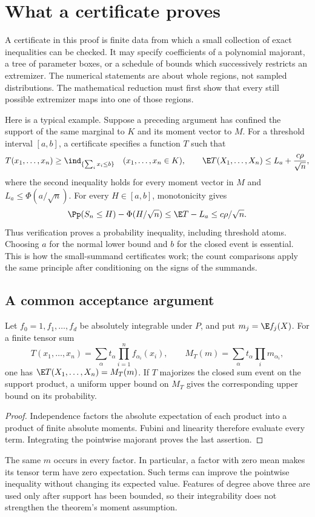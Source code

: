 \section{What a certificate proves}
\label{j:cert:section}

A certificate in this proof is finite data from which a small collection
of exact inequalities can be checked. It may specify coefficients of a
polynomial majorant, a tree of parameter boxes, or a schedule of bounds
which successively restricts an extremizer. The numerical statements are
about whole regions, not sampled distributions. The mathematical
reduction must first show that every still possible extremizer maps into
one of those regions.

Here is a typical example. Suppose a preceding argument has confined the
support of the same marginal to $K$ and its moment vector to $M$.
For a threshold interval $[a,b]$, a certificate specifies a function $T$
such that
\[
 T(x_1,\ldots,x_n)\ge\ind_{\{\sum_i x_i\le b\}}
 \quad(x_1,\ldots,x_n\in K),\qquad
 \E T(X_1,\ldots,X_n)\le L_a+\frac{c\rho}{\sqrt n},
\]
where the second inequality holds for every moment vector in $M$ and
$L_a\le\Phi(a/\sqrt n)$. For every $H\in[a,b]$, monotonicity gives
\[
 \Pp(S_n\le H)-\Phi(H/\sqrt n)
 \le\E T-L_a\le c\rho/\sqrt n.
\]
Thus verification proves a probability inequality, including threshold
atoms. Choosing $a$ for the normal lower bound and $b$ for the closed
event is essential. This is how the small-summand certificates work;
the count comparisons apply the same principle after conditioning on
the signs of the summands.

\subsection{A common acceptance argument}

\begin{lemma}\label{j:cert:tensor}
Let $f_0=1,f_1,\ldots,f_d$ be absolutely integrable under $P$, and put
$m_j=\E f_j(X)$. For a finite tensor sum
\[
 T(x_1,\ldots,x_n)=\sum_\alpha t_\alpha
                         \prod_{i=1}^n f_{\alpha_i}(x_i),
 \qquad M_T(m)=\sum_\alpha t_\alpha\prod_i m_{\alpha_i},
\]
one has $\E T(X_1,\ldots,X_n)=M_T(m)$. If $T$ majorizes the
closed sum event on the support product, a uniform upper bound on
$M_T$ gives the corresponding upper bound on its probability.
\end{lemma}
\begin{proof}
Independence factors the absolute expectation of each product into a
product of finite absolute moments. Fubini and linearity therefore
evaluate every term. Integrating the pointwise majorant proves the
last assertion.
\end{proof}
The same $m$ occurs in every factor. In particular, a factor with zero
mean makes its tensor term have zero expectation. Such terms can improve
the pointwise inequality without changing its expected value. Features
of degree above three are used only after support has been bounded, so
their integrability does not strengthen the theorem's moment assumption.

